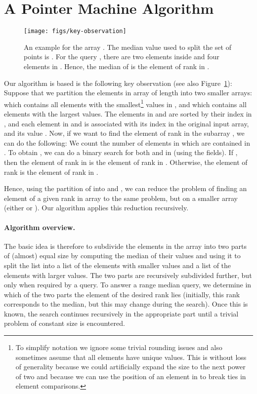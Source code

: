 \documentclass[a4paper,10pt]{article}
\begin{document}
\section{A Pointer Machine Algorithm}
\label{s:pointermachine}

\begin{figure}
\begin{center}
\texttt{[image: figs/key-observation]}
\end{center}
\caption{An example for the array .
The median value used to split the set of points is . For the query , there are two elements inside  and four elements in . Hence, the median of  is the element of rank  in . }
\label{fig:key-observation}
\end{figure}

Our algorithm is based is the following key observation
(see also Figure~\ref{fig:key-observation}): Suppose that we partition
the elements in array  of length  into two smaller arrays:
 which contains all elements with the 
smallest\footnote{To simplify
  notation we ignore some trivial rounding issues and also sometimes
  assume that all elements have unique values. This is without loss of
  generality because we could artificially expand the size  to the next power of two and
  because we can use the position of an element in  to break ties in element comparisons.} values in , and  which contains all elements with the
 largest values. The elements in  and  are sorted
by their index in , and each element  in  and  is
associated with its index  in the original input array, and its value .  Now, if
we want to find the element of rank  in the subarray ,
we can do the following: We count the number  of elements in 
which are contained in .  To obtain , we can do a binary
search for both  and  in  (using the  fields).  If
, then the element of rank  in  is
 the element of rank  in . Otherwise, the
element of rank  is  the element of rank  in
.

Hence, using the partition of  into  and , we can reduce the problem of finding an element of a given rank in array 
to the same problem, but on a smaller array (either  or ). Our algorithm applies this reduction recursively.

\paragraph*{Algorithm overview.}
The basic idea is therefore to subdivide the  elements in the array
into two parts of (almost) equal size by computing the median of
their values and using it to split the list into a list of
the 
elements with smaller values and a list of the 
elements with larger values.  The two parts are recursively subdivided
further, but only when required by a query.
To answer a range median query, we determine in which of the two parts
the element of the desired rank lies (initially, this rank corresponds
to the median, but this may change during the search).  Once this is
known, the search continues recursively in the appropriate part until
a trivial problem of constant size  is encountered.
\end{document}
